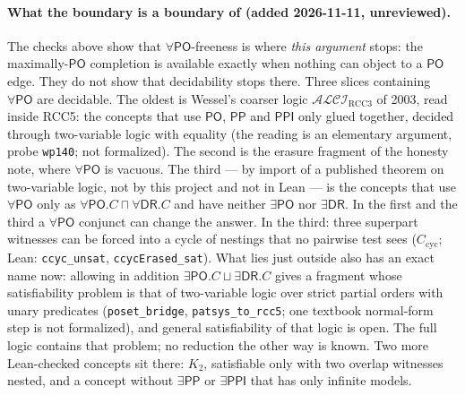 \documentclass[11pt]{article}
\newcommand{\DR}{\ensuremath{\mathsf{DR}}}
\newcommand{\PO}{\ensuremath{\mathsf{PO}}}
\newcommand{\PP}{\ensuremath{\mathsf{PP}}}
\newcommand{\PPI}{\ensuremath{\mathsf{PPI}}}
\newcommand{\code}[1]{\texttt{#1}}
\begin{document}
\paragraph{What the boundary is a boundary of (added 2026-11-11,
unreviewed).} The checks above show that $\forall\PO$-freeness is where
\emph{this argument} stops: the maximally-$\PO$ completion is available
exactly when nothing can object to a $\PO$ edge. They do not show that
decidability stops there. Three slices containing $\forall\PO$ are decidable.
The oldest is Wessel's coarser logic $\mathcal{ALCI}_{\mathrm{RCC3}}$ of 2003, read
inside RCC5: the concepts that use $\PO$, $\PP$ and $\PPI$ only glued together,
decided through two-variable logic with equality (the reading is an elementary
argument, probe \code{wp140}; not formalized). The second is the erasure
fragment of the honesty note, where $\forall\PO$ is vacuous. The third ---
by import of a published theorem on two-variable logic, not by this
project and not in Lean --- is the concepts that use $\forall\PO$ only as
$\forall\PO.C\sqcap\forall\DR.C$ and have neither $\exists\PO$ nor
$\exists\DR$. In the first and the third a $\forall\PO$ conjunct can change
the answer. In the third:
three superpart witnesses can be forced into a cycle of nestings that no
pairwise test sees ($C_{\mathrm{cyc}}$; Lean: \code{ccyc\_unsat},
\code{ccycErased\_sat}). What lies just outside also has an exact name now:
allowing in addition $\exists\PO.C\sqcup\exists\DR.C$ gives a fragment whose
satisfiability problem is that of two-variable logic over strict partial
orders with unary predicates (\code{poset\_bridge}, \code{patsys\_to\_rcc5};
one textbook normal-form step is not formalized), and general satisfiability
of that logic is open. The full logic contains that problem; no reduction the
other way is known. Two more Lean-checked concepts sit there: $K_2$,
satisfiable only with two overlap witnesses nested, and a concept without
$\exists\PP$ or $\exists\PPI$ that has only infinite models.
\end{document}

